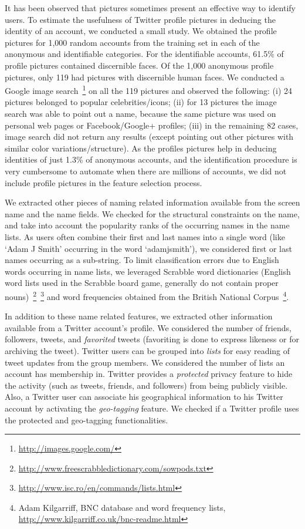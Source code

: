 \documentclass[conference]{IEEEtran}
\begin{document}
It has been observed that pictures sometimes present an effective way to identify users.  To estimate the usefulness of Twitter profile pictures in deducing the identity of an account, we conducted a small study. We obtained the profile pictures for 1,000 random accounts from the training set in each of the anonymous and identifiable categories. For the identifiable accounts,
61.5\% of profile pictures contained discernible faces.
Of the 1,000 anonymous profile pictures, only 119 had pictures with discernible human faces. We conducted a Google image search~\footnote{\url{http://images.google.com/}} on all the 119 pictures and observed the following:
(i) 24 pictures belonged to popular celebrities/icons; 
(ii) for 13 pictures the image search was able to point out a name, because the same picture was used on 
personal web pages or Facebook/Google+ profiles;
(iii) in the remaining 82 cases, image search did not return any results (except pointing out other pictures with similar color variations/structure). 
As the profiles pictures help in deducing identities of just 1.3\% of anonymous accounts, and the identification procedure is very cumbersome to automate when there are millions of accounts, we did not include profile pictures in the feature selection process.  

We extracted other pieces of naming related information available from the screen name and the name fields.
We checked for the structural constraints on the name, and take into account the popularity ranks of the occurring names in the name lists. As users often combine their first and last names into a single word (like `Adam J Smith' occurring in the word `adamjsmith'), we considered first or last names occurring as a sub-string. To limit classification errors due to English words occurring in name lists, we leveraged Scrabble word dictionaries (English word lists used in the Scrabble board game, generally do not contain proper nouns)~\footnote{\url{http://www.freescrabbledictionary.com/sowpods.txt}}~\footnote{\url{http://www.isc.ro/en/commands/lists.html}}
and word frequencies obtained from the British National Corpus~\footnote{Adam Kilgarriff, BNC database and word frequency lists, \url{http://www.kilgarriff.co.uk/bnc-readme.html}}.

In addition to these name related features, we extracted other information available from a Twitter account's profile. We considered the number of friends, followers, tweets, and \textit{favorited} tweets (favoriting is done to express likeness or for archiving the tweet). Twitter users can be grouped into \textit{lists} for easy reading of tweet updates from the group members. We considered the number of lists an account has membership in. Twitter provides a \textit{protected} privacy feature to hide the activity (such as tweets, friends, and followers) from being publicly visible. Also, a Twitter user can associate his geographical information to his Twitter account by activating the \textit{geo-tagging} feature. We checked if a Twitter profile uses the protected and geo-tagging functionalities. 
\end{document}
